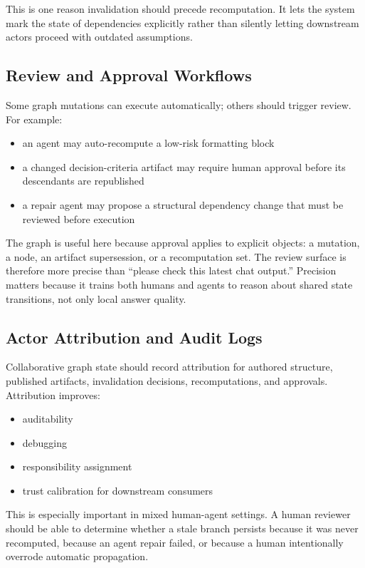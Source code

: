 \documentclass{article}
\begin{document}
This is one reason invalidation should precede recomputation. It lets the system mark the state of dependencies explicitly rather than silently letting downstream actors proceed with outdated assumptions.

\subsection{Review and Approval Workflows}

Some graph mutations can execute automatically; others should trigger review. For example:
\begin{itemize}
\item an agent may auto-recompute a low-risk formatting block
\item a changed decision-criteria artifact may require human approval before its descendants are republished
\item a repair agent may propose a structural dependency change that must be reviewed before execution
\end{itemize}

The graph is useful here because approval applies to explicit objects: a mutation, a node, an artifact supersession, or a recomputation set. The review surface is therefore more precise than ``please check this latest chat output.'' Precision matters because it trains both humans and agents to reason about shared state transitions, not only local answer quality.

\subsection{Actor Attribution and Audit Logs}

Collaborative graph state should record attribution for authored structure, published artifacts, invalidation decisions, recomputations, and approvals. Attribution improves:
\begin{itemize}
\item auditability
\item debugging
\item responsibility assignment
\item trust calibration for downstream consumers
\end{itemize}

This is especially important in mixed human-agent settings. A human reviewer should be able to determine whether a stale branch persists because it was never recomputed, because an agent repair failed, or because a human intentionally overrode automatic propagation.
\end{document}
